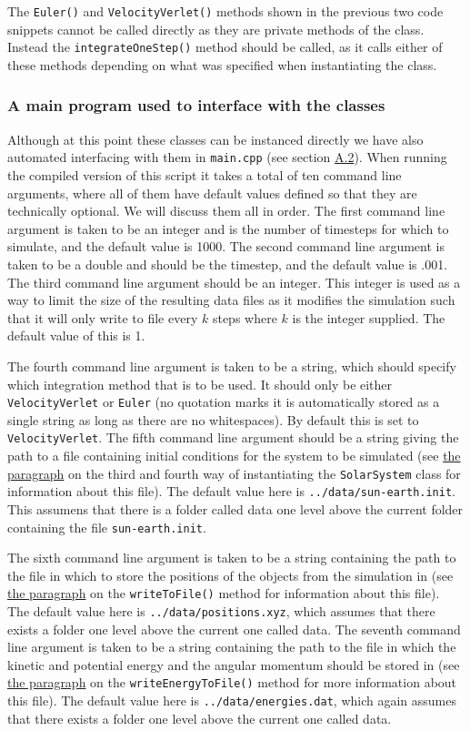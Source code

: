 \documentclass[reprint,english,notitlepage]{revtex4-1}  %
\begin{document}
The \verb+Euler()+ and \verb+VelocityVerlet()+ methods shown in the previous two code snippets cannot be called directly as they are private methods of the class. Instead the \verb+integrateOneStep()+ method should be called, as it calls either of these methods depending on what was specified when instantiating the class.


\subsubsection{A main program used to interface with the classes} \label{sec:III:a:4}

Although at this point these classes can be instanced directly we have also automated interfacing with them in \verb+main.cpp+ (see section \hyperref[A.2]{A.2}). When running the compiled version of this script it takes a total of ten command line arguments, where all of them have default values defined so that they are technically optional. We will discuss them all in order. The first command line argument is taken to be an integer and is the number of timesteps for which to simulate, and the default value is 1000. The second command line argument is taken to be a double and should be the timestep, and the default value is .001. The third command line argument should be an integer. This integer is used as a way to limit the size of the resulting data files as it modifies the simulation such that it will only write to file every $k$ steps where $k$ is the integer supplied. The default value of this is 1.

The fourth command line argument is taken to be a string, which should specify which integration method that is to be used. It should only be either \verb+VelocityVerlet+ or \verb+Euler+ (no quotation marks it is automatically stored as a single string as long as there are no whitespaces). By default this is set to \verb+VelocityVerlet+. The fifth command line argument should be a string giving the path to a file containing initial conditions for the system to be simulated (see \hyperref[poi:initfile]{the paragraph} on the third and fourth way of instantiating the \verb+SolarSystem+ class for information about this file). The default value here is \verb+../data/sun-earth.init+. This assumens that there is a folder called data one level above the current folder containing the file \verb+sun-earth.init+.

The sixth command line argument is taken to be a string containing the path to the file in which to store the positions of the objects from the simulation in (see \hyperref[poi:write_to_file]{the paragraph} on the \verb+writeToFile()+ method for information about this file). The default value here is \verb+../data/positions.xyz+, which assumes that there exists a folder one level above the current one called data. The seventh command line argument is taken to be a string containing the path to the file in which the kinetic and potential energy and the angular momentum should be stored in (see \hyperref[poi:write_energy_to_file]{the paragraph} on the \verb+writeEnergyToFile()+ method for more information about this file). The default value here is \verb+../data/energies.dat+, which again assumes that there exists a folder one level above the current one called data.
\end{document}
